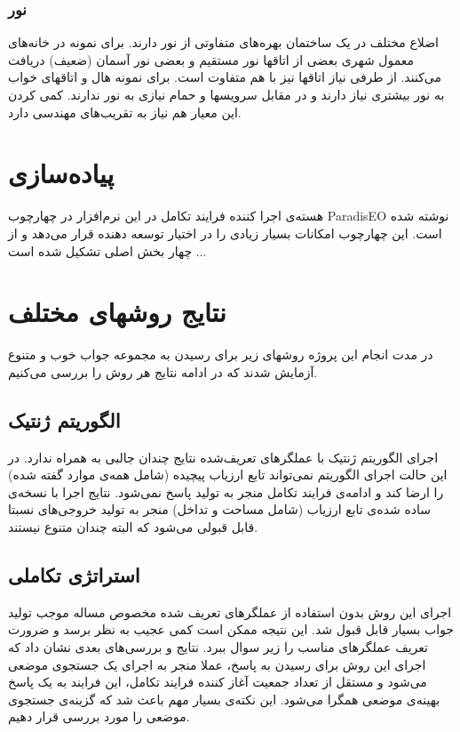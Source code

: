 \documentclass{report}
\begin{document}
\subsubsection{نور}
اضلاع مختلف در یک ساختمان بهره‌های متفاوتی از نور دارند. برای نمونه در خانه‌های معمول شهری بعضی از اتاقها نور مستقیم و بعضی نور آسمان (ضعیف) دریافت می‌کنند. از طرفی نیاز اتاقها نیز با هم متفاوت است. برای نمونه هال و اتاقهای خواب به نور بیشتری نیاز دارند و در مقابل سرویسها و حمام نیازی به نور ندارند. کمی کردن این معیار هم نیاز به تقریب‌های مهندسی دارد. 

\section{پیاده‌سازی}
هسته‌ی اجرا کننده فرایند تکامل در این نرم‌افزار در چهارچوب ParadisEO نوشته شده است. این چهارچوب امکانات بسیار زیادی را در اختیار توسعه دهنده قرار می‌دهد و از چهار بخش اصلی تشکیل شده است ...

\section{نتایج روشهای مختلف}
در مدت انجام این پروژه روشهای زیر برای رسیدن به مجموعه جواب خوب و متنوع آزمایش شدند که در ادامه نتایج هر روش را بررسی می‌کنیم.

\subsection{الگوریتم ژنتیک}
اجرای الگوریتم ژنتیک با عملگرهای تعریف‌شده نتایج چندان جالبی به همراه ندارد. در این حالت اجرای الگوریتم نمی‌تواند تابع ارزیاب پیچیده (شامل همه‌ی موارد گفته شده) را ارضا کند و ادامه‌ی فرایند تکامل منجر به تولید پاسخ نمی‌شود. نتایج اجرا با نسخه‌ی ساده شده‌ی تابع ارزیاب (شامل مساحت و تداخل) منجر به تولید خروجی‌های نسبتا قابل قبولی می‌شود که البته چندان متنوع نیستند.

\subsection{استراتژی تکاملی}
اجرای این روش بدون استفاده از عملگرهای تعریف شده مخصوص مساله موجب تولید جواب بسیار قابل قبول شد. این نتیجه ممکن است کمی عجیب به نظر برسد و ضرورت تعریف عملگرهای مناسب را زیر سوال ببرد. نتایج و بررسی‌های بعدی نشان داد که اجرای این روش برای رسیدن به پاسخ، عملا منجر به اجرای یک جستجوی موضعی می‌شود و مستقل از تعداد جمعیت آغاز کننده فرایند تکامل، این فرایند به یک پاسخ بهینه‌ی موضعی همگرا می‌شود. این نکته‌ی بسیار مهم باعث شد که گزینه‌ی جستجوی موضعی را مورد بررسی قرار دهیم.
\end{document}
